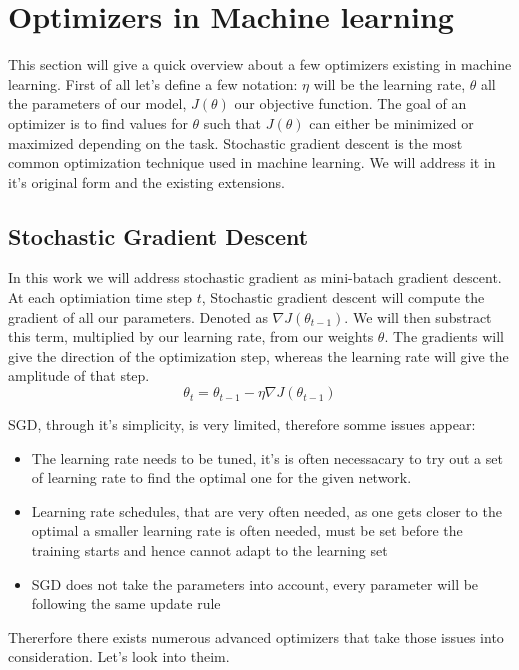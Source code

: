 \section{Optimizers in Machine learning}
This section will give a quick overview about a few optimizers existing in machine learning. First of all let's define a few notation: 
$\eta$ will be the learning rate, $\theta$ all the parameters of our model, $J(\theta)$ our objective function. The goal of an optimizer is to find values for $\theta$ such that $J(\theta)$ can either be minimized or maximized depending on the task. Stochastic gradient descent is the most common optimization technique used in machine learning.  We will address it in it's original form and the existing extensions. 
\subsection{Stochastic Gradient Descent}
In this work we will address stochastic gradient as mini-batach gradient descent. At each optimiation time step $t$, Stochastic gradient descent will compute the gradient of all our parameters. Denoted as $  \nabla J(\theta_{t-1})$. We will then substract this term, multiplied by our learning rate, from our weights $\theta$. The gradients will give the direction of the optimization step, whereas the learning rate will give the amplitude of that step.
\begin{equation}
\theta_t = \theta_{t-1} - \eta \nabla J(\theta_{t-1})
\end{equation}

SGD, through it's simplicity, is very limited, therefore somme issues appear:

\begin{itemize}
\item The learning rate needs to be tuned, it's is often necessacary to try out a set of learning rate to find the optimal one for the given network. 
\item Learning rate schedules, that are very often needed, as one gets closer to the optimal a smaller learning rate is often needed, must be set before the training starts and hence cannot adapt to the learning set
\item SGD does not take the parameters into account, every parameter will be following the same update rule
\end{itemize}

Thererfore there exists numerous advanced optimizers that take those issues into consideration. Let's look into theim. 

